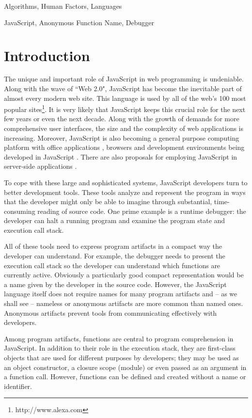 \documentclass[10pt, preprint]{sigplanconf}
\begin{document}
\terms
Algorithms, Human Factors, Languages

\keywords
JavaScript, Anonymous Function Name, Debugger

\section{Introduction}
The unique and important role of JavaScript in web programming is undeniable. Along with the wave of ``Web 2.0", JavaScript has become the inevitable part of almost every modern web site. This language is used by all of the web's 100 most popular sites\footnote[1]{http://www.alexa.com}\cite{Richards1}. It is very likely that JavaScript keeps this crucial role for the next few years or even the next decade. Along with the growth of demands for more comprehensive user interfaces, the size and the complexity of web applications is increasing. Moreover, JavaScript is also becoming a general purpose computing platform with office applications \cite{JSOffice, JSOffice2}, browsers \cite{FAO, GCE} and development environments \cite{Ingalls} being developed in JavaScript \cite{Richards2}. There are also proposals for employing JavaScript in server-side applications \cite{SSJSR, CJS}.

To cope with these large and sophisticated systems, JavaScript developers turn to better development tools. These tools analyze and represent the program in ways that the developer might only be able to imagine through substantial, time-consuming reading of source code.  One prime example is a runtime debugger: the developer can halt a running program and examine the program state and execution call stack. 

All of these tools need to express program artifacts in a compact way the developer can understand.  For example, the debugger needs to present the execution call stack so the developer can understand which functions are currently active.  Obviously a particularly good compact representation would be a name given by the developer in the source code. However, the JavaScript language itself does not require names for many program artifacts and -- as we shall see -- nameless or anonymous artifacts are more common than named ones. Anonymous artifacts prevent tools from communicating effectively with developers.

Among program artifacts, functions are central to program comprehension in JavaScript. In addition to their role in the execution stack, they are first-class objects that are used for different purposes by developers; they may be used as an object constructor, a closure scope (module) or even  passed as an argument in a function call. However, functions can be defined and created without a name or identifier.  
\end{document}
